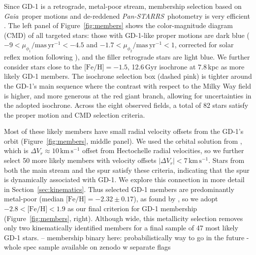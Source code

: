 \documentclass[twocolumn]{aastex63}
\newcommand{\gaia}{\textsl{Gaia}}
\newcommand{\pans}{\textsl{Pan-STARRS}}
\newcommand{\kms}{\ensuremath{\textrm{km}\,\textrm{s}^{-1}}}
\newcommand{\masyr}{\ensuremath{\textrm{mas}\,\textrm{yr}^{-1}}}
\newcommand{\feh}{\ensuremath{\textrm{[Fe/H]}}}
\begin{document}
Since GD-1 is a retrograde, metal-poor stream, membership selection based on \gaia\ proper motions \citep{gdr2} and de-reddened \pans\ photometry \citep{sfd, ps1} is very efficient \citep[e.g.,][]{pwb}.
The left panel of Figure~\ref{fig:members} shows the color-magnitude diagram (CMD) of all targeted stars: those with GD-1-like proper motions are dark blue ($-9<\mu_{\phi_1}/\masyr<-4.5$ and $-1.7<\mu_{\phi_2}/\masyr<1$, corrected for solar reflex motion following \citealt{pwb}), and the filler retrograde stars are light blue.
We further consider stars close to the $\textrm{[Fe/H]}=-1.5$, 12.6\,Gyr isochrone at 7.8\,kpc \citep{choi2016} as more likely GD-1 members.
The isochrone selection box (dashed pink) is tighter around the GD-1's main sequence where the contrast with respect to the Milky Way field is higher, and more generous at the red giant branch, allowing for uncertainties in the adopted isochrone.
Across the eight observed fields, a total of 82 stars satisfy the proper motion and CMD selection criteria.

Most of these likely members have small radial velocity offsets from the GD-1's orbit (Figure~\ref{fig:members}, middle panel).
We used the orbital solution from \citet{pwb}, which is $\Delta V_r\approx10\,\kms$ offset from Hectochelle radial velocities, so we further select 50 more likely members with velocity offsets $|\Delta V_r| < 7\,\kms$.
Stars from both the main stream and the spur satisfy these criteria, indicating that the spur is dynamically associated with GD-1.
We explore this connection in more detail in Section~\ref{sec:kinematics}.
Thus selected GD-1 members are predominantly metal-poor (median $\feh=-2.32\pm0.17$), as found by \citet{malhan2019}, so we adopt $-2.8<\feh<1.9$ as our final criterion for GD-1 membership (Figure~\ref{fig:members}, right).
Although wide, this metallicity selection removes only two kinematically identified members for a final sample of 47 most likely GD-1 stars.
-- membership binary here: probabilistically way to go in the future
- whole spec sample available on zenodo w separate flags
\end{document}
